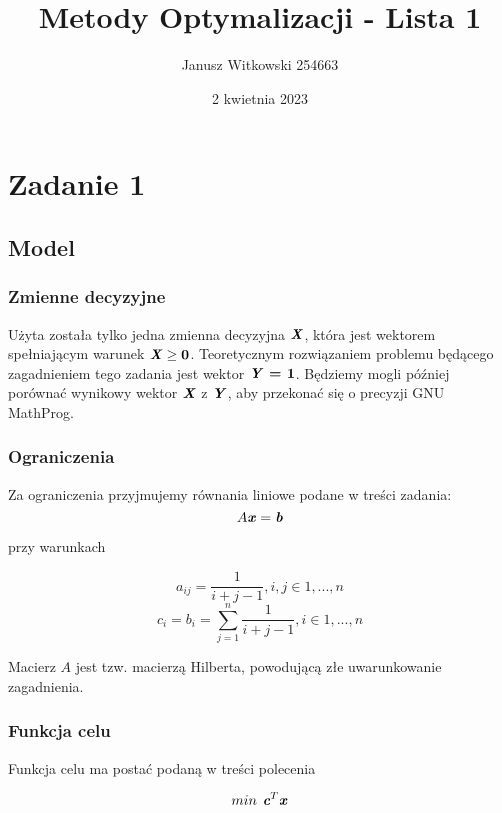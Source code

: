 \documentclass{article}
\title{Metody Optymalizacji - Lista 1}
\author{Janusz Witkowski 254663}
\date{2 kwietnia 2023}
\theoremstyle{definition}
\theoremstyle{remark}
\theoremstyle{plain}
\theoremstyle{remark}
\theoremstyle{plain}
\begin{document}
\maketitle

\section{Zadanie 1}
\subsection{Model}
\subsubsection{Zmienne decyzyjne}
Użyta została tylko jedna zmienna decyzyjna $\textbf{\textit{X}}$, która jest wektorem spełniającym warunek $\textbf{\textit{X}} \geq \textbf{0}$.
Teoretycznym rozwiązaniem problemu będącego zagadnieniem tego zadania jest wektor $\textbf{\textit{Y}} \textbf{ = 1} $.
Będziemy mogli później porównać wynikowy wektor $\textbf{\textit{X}}$ z $\textbf{\textit{Y}}$, aby przekonać się o precyzji GNU MathProg.

\subsubsection{Ograniczenia}
Za ograniczenia przyjmujemy równania liniowe podane w treści zadania:
\[A\textbf{\textit{x}}=\textbf{\textit{b}}\]

przy warunkach

\[a_{ij} = \frac{1}{i+j-1}, i,j \in 1,...,n\]
\[c_i = b_i = \sum_{j=1}^n{\frac{1}{i+j-1}}, i \in 1,...,n\]

Macierz $A$ jest tzw. macierzą Hilberta, powodującą złe uwarunkowanie zagadnienia.

\subsubsection{Funkcja celu}
Funkcja celu ma postać podaną w treści polecenia 

\[ min {\textit{{\textbf{ c}}}}^T \textbf{\textit{x}} \]
\end{document}
